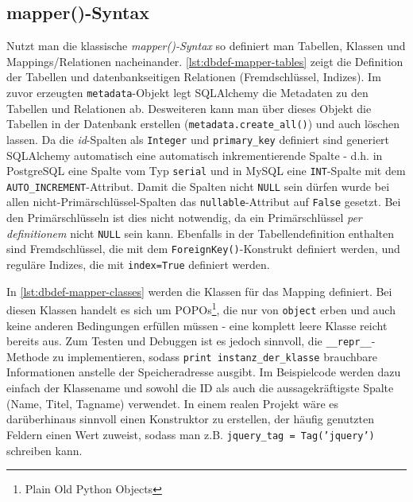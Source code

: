 \subsection{mapper()-Syntax}

Nutzt man die klassische \emph{mapper()-Syntax} so definiert man Tabellen,
Klassen und Mappings/Relationen nacheinander.
\autoref{lst:dbdef-mapper-tables} zeigt die Definition der Tabellen und
datenbankseitigen Relationen (Fremdschlüssel, Indizes). Im zuvor erzeugten
\texttt{metadata}-Objekt legt SQLAlchemy die Metadaten zu den Tabellen und
Relationen ab. Desweiteren kann man über dieses Objekt die Tabellen in der
Datenbank erstellen (\texttt{metadata.create\_all()}) und auch löschen lassen.
Da die \emph{id}-Spalten als \texttt{Integer} und \texttt{primary\_key}
definiert sind generiert SQLAlchemy automatisch eine automatisch
inkrementierende Spalte - d.h. in PostgreSQL eine Spalte vom Typ \texttt{serial}
und in MySQL eine \texttt{INT}-Spalte mit dem \texttt{AUTO\_INCREMENT}-Attribut.
Damit die Spalten nicht \texttt{NULL} sein dürfen wurde bei allen
nicht-Primärschlüssel-Spalten das \texttt{nullable}-Attribut auf \texttt{False}
gesetzt. Bei den Primärschlüsseln ist dies nicht notwendig, da ein
Primärschlüssel \textit{per definitionem} nicht \texttt{NULL} sein kann.
Ebenfalls in der Tabellendefinition enthalten sind Fremdschlüssel, die mit dem
\texttt{ForeignKey()}-Konstrukt definiert werden, und reguläre Indizes, die mit
\texttt{index=True} definiert werden.



In \autoref{lst:dbdef-mapper-classes} werden die Klassen für das Mapping
definiert. Bei diesen Klassen handelt es sich um POPOs\footnote{Plain Old Python
Objects}, die nur von \texttt{object} erben und auch keine anderen Bedingungen
erfüllen müssen - eine komplett leere Klasse reicht bereits aus. Zum Testen und
Debuggen ist es jedoch sinnvoll, die \texttt{\_\_repr\_\_}-Methode zu
implementieren, sodass \texttt{print instanz\_der\_klasse} brauchbare
Informationen anstelle der Speicheradresse ausgibt. Im Beispielcode werden dazu
einfach der Klassename und sowohl die ID als auch die aussagekräftigste Spalte
(Name, Titel, Tagname) verwendet. In einem realen Projekt wäre es darüberhinaus
sinnvoll einen Konstruktor zu erstellen, der häufig genutzten Feldern einen Wert
zuweist, sodass man z.B. \texttt{jquery\_tag = Tag('jquery')} schreiben kann.

